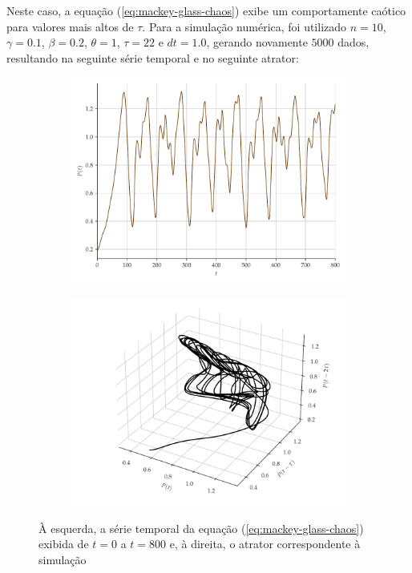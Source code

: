 \documentclass[9pt, technote]{article}
\begin{document}
Neste caso, a equação (\ref{eq:mackey-glass-chaos}) exibe um comportamente caótico para valores mais altos de $\tau$. Para a simulação numérica, foi utilizado $n = 10$, $\gamma = 0.1$, $\beta = 0.2$, $\theta = 1$, $\tau = 22$ e $dt = 1.0$, gerando novamente $5000$ dados, resultando na seguinte série temporal e no seguinte atrator:
\begin{figure}[H]
     \begin{subfigure}[t]{0.24\textwidth}
         \includegraphics[scale=0.24]{serie-mackeyglass.pdf}
     \end{subfigure}
     \centering
     \begin{subfigure}[t]{0.24\textwidth}
         \includegraphics[scale=0.24]{atrator-mackeyglass.pdf}
     \end{subfigure}
     \caption{À esquerda, a série temporal da equação (\ref{eq:mackey-glass-chaos}) exibida de $t = 0 $ a $t = 800$ e, à direita, o atrator correspondente à simulação}
     \label{fig:mackey-glass}
\end{figure}
\end{document}
